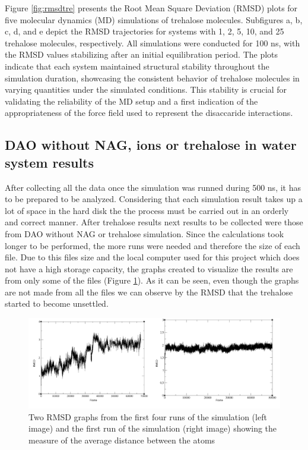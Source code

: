 \documentclass[12pt,twoside]{article}
\begin{document}
Figure \ref{fig:rmsdtre} presents the Root Mean Square Deviation (RMSD) plots for five molecular dynamics (MD) simulations of trehalose molecules. Subfigures a, b, c, d, and e depict the RMSD trajectories for systems with 1, 2, 5, 10, and 25 trehalose molecules, respectively. All simulations were conducted for 100 ns, with the RMSD values stabilizing after an initial equilibration period. The plots indicate that each system maintained structural stability throughout the simulation duration, showcasing the consistent behavior of trehalose molecules in varying quantities under the simulated conditions. This stability is crucial for validating the reliability of the MD setup and a first indication of the appropriateness of the force field used to represent the disaccaride interactions.


\subsection{DAO without NAG, ions or trehalose in water system results}

After collecting all the data once the simulation was runned during 500 ns, it has to be prepared to be analyzed. Considering that each simulation result takes up a lot of space in the hard disk the the process must be carried out in an orderly and correct manner.
After trehalose results next results to be collected were those from DAO without NAG or trehalose simulation. Since the calculations took longer to be performed, the more runs were needed and therefore the size of each file. Due to this files size and the local computer used for this project which does not have a high storage capacity, the graphs created to visualize the results are from only some of the files (Figure \ref{fig:rmsdDAOnoNAG}). As it can be seen, even though the graphs are not made from all the files we can observe by the RMSD that the trehalose started to become unsettled. 



\begin{figure}
    \centering
    \includegraphics[width = 1\hsize]{./figures/rmsdmd1}
    \caption{Two RMSD graphs from the first four runs of the simulation (left image) and the first run of the simulation (right image) showing the measure of the average distance between the atoms}
    \label{fig:rmsdDAOnoNAG}
\end{figure}
\end{document}
